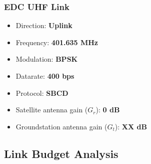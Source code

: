 \subsubsection{EDC UHF Link}

\begin{itemize}
    \item Direction: \textbf{Uplink}
    \item Frequency: \textbf{401.635 MHz}
    \item Modulation: \textbf{BPSK}
    \item Datarate: \textbf{400 bps}
    \item Protocol: \textbf{SBCD}
    \item Satellite antenna gain ($G_{r}$): \textbf{0 dB}
    \item Groundstation antenna gain ($G_{t}$): \textbf{XX dB}
\end{itemize}

\subsection{Link Budget Analysis}

